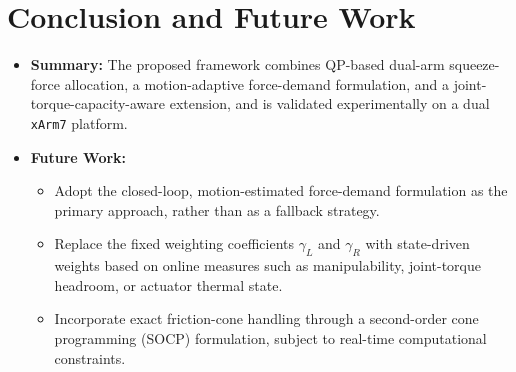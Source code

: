 \documentclass[conference]{IEEEtran}
\begin{document}
\section*{Conclusion and Future Work}
\begin{itemize}
    \item \textbf{Summary:} The proposed framework combines QP-based dual-arm squeeze-force allocation, a motion-adaptive force-demand formulation, and a joint-torque-capacity-aware extension, and is validated experimentally on a dual \texttt{xArm7} platform.

    \item \textbf{Future Work:}
    \begin{itemize}
        \item Adopt the closed-loop, motion-estimated force-demand formulation as the primary approach, rather than as a fallback strategy.

        \item Replace the fixed weighting coefficients \(\gamma_L\) and \(\gamma_R\) with state-driven weights based on online measures such as manipulability, joint-torque headroom, or actuator thermal state.

        \item Incorporate exact friction-cone handling through a second-order cone programming (SOCP) formulation, subject to real-time computational constraints.
    \end{itemize}
\end{itemize}
\end{document}
